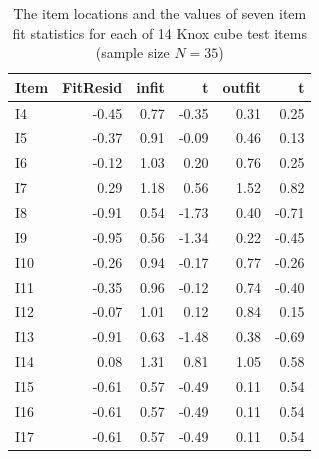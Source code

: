 \begin{table}[b!]
\centering
\caption{The item locations and the values of seven item fit statistics for each of 14 Knox cube test items (sample size $N=35$)}\label{knox}
\begin{tabular}{lrrrrr}
\toprule
Item & FitResid & infit &     t & outfit &  t   \\
\midrule
I4 &   -0.45 &  0.77 & -0.35 & 0.31  &  0.25\\
I5 &   -0.37 &  0.91 & -0.09 & 0.46  &  0.13\\
I6 &   -0.12 &  1.03 &  0.20 & 0.76  &  0.25\\
I7 &    0.29 &  1.18 &  0.56 & 1.52  &  0.82\\
I8 &   -0.91 &  0.54 & -1.73 & 0.40  & -0.71\\
I9 &   -0.95 &  0.56 & -1.34 & 0.22  & -0.45\\
I10&   -0.26 &  0.94 & -0.17 & 0.77  & -0.26\\
I11&   -0.35 &  0.96 & -0.12 & 0.74  & -0.40\\
I12&   -0.07 &  1.01 &  0.12 & 0.84  &  0.15\\
I13&   -0.91 &  0.63 & -1.48 & 0.38  & -0.69\\
I14&    0.08 &  1.31 &  0.81 & 1.05  &  0.58\\
I15&   -0.61 &  0.57 & -0.49 & 0.11  &  0.54\\
I16&   -0.61 &  0.57 & -0.49 & 0.11  &  0.54\\
I17&   -0.61 &  0.57 & -0.49 & 0.11  &  0.54\\
\bottomrule
\end{tabular}
\end{table}
